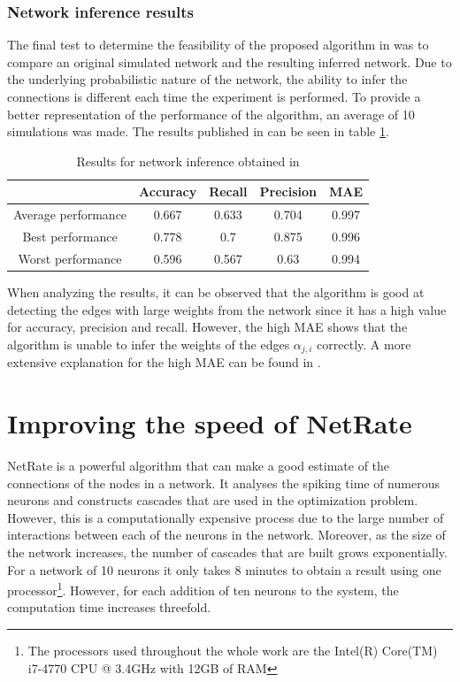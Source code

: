 \documentclass[11pt]{article}
\begin{document}
\subsubsection{Network inference results}

The final test to determine the feasibility of the proposed algorithm in \cite{alexandru2018estimating} was to compare an original simulated network and the resulting inferred network. Due to the underlying probabilistic nature of the network, the ability to infer the connections is different each time the experiment is performed. To provide a better representation of the performance of the algorithm, an average of 10 simulations was made. The results published in \cite{alexandru2018estimating} can be seen in table \ref{tab:results_pranav}.

\begin{table}
    \centering
    \begin{tabular}{|c|c|c|c|c|}
		\hline
		& Accuracy & Recall & Precision & MAE \\
		\hline
		Average performance & 0.667 & 0.633 & 0.704 & 0.997 \\
		\hline
		Best performance & 0.778 & 0.7 & 0.875 & 0.996  \\
		\hline
		Worst performance & 0.596 & 0.567 & 0.63 & 0.994 \\
		\hline
		\end{tabular}
		\caption{Results for network inference obtained in \cite{alexandru2018estimating}}
		\label{tab:results_pranav}
\end{table}

When analyzing the results, it can be observed that the algorithm is good at detecting the edges with large weights from the network since it has a high value for accuracy, precision and recall. However, the high MAE shows that the algorithm is unable to infer the weights of the edges $\alpha_{j,i}$ correctly. A more extensive explanation for the high MAE can be found in \cite{pranav_report}.


\section{Improving the speed of NetRate}

NetRate is a powerful algorithm that can make a good estimate of the connections of the nodes in a network. It analyses the spiking time of numerous neurons and constructs cascades that are used in the optimization problem. However, this is a computationally expensive process due to the large number of interactions between each of the neurons in the network. Moreover, as the size of the network increases, the number of cascades that are built grows exponentially. For a network of 10 neurons it only takes 8 minutes to obtain a result using one processor\footnote{The processors used throughout the whole work are the Intel(R) Core(TM) i7-4770 CPU @ 3.4GHz with 12GB of RAM}. However, for each addition of ten neurons to the system, the computation time increases threefold. 
\end{document}

